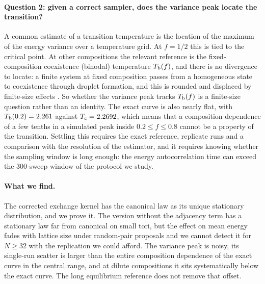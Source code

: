 \paragraph{Question 2: given a correct sampler, does the variance peak locate the transition?}
A common estimate of a transition temperature is the location of the maximum of the energy variance over a temperature grid. At $f=1/2$ this is tied to the critical point. At other compositions the relevant reference is the fixed-composition coexistence (binodal) temperature $T_{\mathrm b}(f)$, and there is no divergence to locate: a finite system at fixed composition passes from a homogeneous state to coexistence through droplet formation, and this is rounded and displaced by finite-size effects \citep{binder1987,biskup2002}. So whether the variance peak tracks $T_{\mathrm b}(f)$ is a finite-size question rather than an identity. The exact curve is also nearly flat, with $T_{\mathrm b}(0.2)=2.261$ against $T_{\mathrm c}=2.2692$, which means that a composition dependence of a few tenths in a simulated peak inside $0.2\le f\le0.8$ cannot be a property of the transition. Settling this requires the exact reference, replicate runs and a comparison with the resolution of the estimator, and it requires knowing whether the sampling window is long enough: the energy autocorrelation time can exceed the 300-sweep window of the protocol we study.

\paragraph{What we find.} The corrected exchange kernel has the canonical law as its unique stationary distribution, and we prove it. The version without the adjacency term has a stationary law far from canonical on small tori, but the effect on mean energy fades with lattice size under random-pair proposals and we cannot detect it for $N\ge32$ with the replication we could afford. The variance peak is noisy, its single-run scatter is larger than the entire composition dependence of the exact curve in the central range, and at dilute compositions it sits systematically below the exact curve. The long equilibrium reference does not remove that offset.

